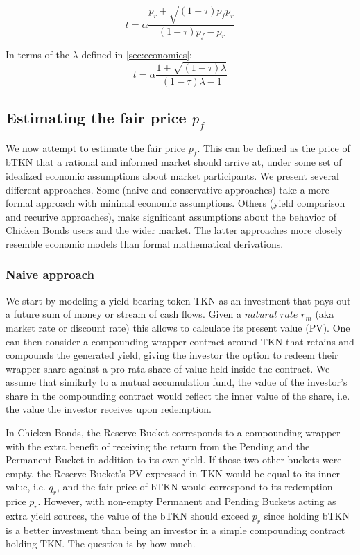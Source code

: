 \documentclass{article}
\begin{document}
\begin{equation}
  \label{eq:optimal_chicken_in_1_fee}
t = \alpha \frac{p_r + \sqrt{(1-\tau)p_f p_r}}{(1-\tau)p_f-p_r}
\end{equation}

In terms of the $\lambda$ defined in \ref{sec:economics}:
\begin{equation}
  \label{eq:optimal_chicken_in_2_fee}
t = \alpha \frac{1 + \sqrt{(1-\tau)\lambda}}{(1-\tau)\lambda - 1}
\end{equation}

\subsection{Estimating the fair price $p_f$}
We now attempt to estimate the fair price $p_f$. This can be defined as the price of bTKN that a rational and informed market should arrive at, under some set of idealized economic assumptions about market participants. We present several different approaches. Some (naive and conservative approaches) take a more formal approach with minimal economic assumptions. Others (yield comparison and recurive approaches), make significant assumptions about the behavior of Chicken Bonds users and the wider market. The latter approaches more closely resemble economic models than formal mathematical derivations.

\subsubsection{Naive approach}
\label{sec:naive_approach}
We start by modeling a yield-bearing token TKN as an investment that pays out a future sum of money or stream of cash flows. Given a $\textit{natural rate}$ $r_m$ (aka market rate or discount rate) this allows to calculate its present value (PV). One can then consider a compounding wrapper contract around TKN that retains and compounds the generated yield, giving the investor the option to redeem their wrapper share against a pro rata share of value held inside the contract. We assume that similarly to a mutual accumulation fund, the value of the investor's share in the compounding contract would reflect the inner value of the share, i.e. the value the investor receives upon redemption. 

In Chicken Bonds, the Reserve Bucket corresponds to a compounding wrapper with the extra benefit of receiving the return from the Pending and the Permanent Bucket in addition to its own yield. If those two other buckets were empty, the Reserve Bucket's PV expressed in TKN would be equal to its inner value, i.e. $q_r$, and the fair price of bTKN would correspond to its redemption price $p_r$. However, with non-empty Permanent and Pending Buckets acting as extra yield sources, the value of the bTKN should exceed $p_r$ since holding bTKN is a better investment than being an investor in a simple compounding contract holding TKN. The question is by how much.
\end{document}
